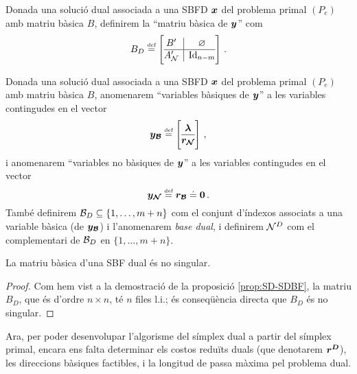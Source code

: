 \begin{defi*}\label{defi:mbd}
	Donada una solució dual associada a una SBFD $\boldsymbol{x}$ del problema primal $(P_e)$ amb matriu bàsica $B$, definirem la ``matriu bàsica de $\boldsymbol{y}$'' com
	\[
		B_D \defeq \left[
		\begin{array}{@{}c|c@{}}
			B'	  &	\varnothing	\\
			\hline
			A_\N' & \Id_{n-m}
		\end{array}
		\right]\,.
	\]
\end{defi*}

\begin{defi}\label{defi:vd}
	Donada una solució dual associada a una SBFD $\boldsymbol{x}$ del problema primal $(P_e)$ amb matriu bàsica $B$, anomenarem ``variables bàsiques de $\boldsymbol{y}$'' a les variables contingudes en el vector
	\[
		\vb{y_\B} \defeq
		\left[\begin{array}{@{}c@{}}
			\vb{\lambda}\\
			\hline
			\vb{r_\N}
		\end{array}\right]\,,
	\]
	i anomenarem ``variables no bàsiques de $\boldsymbol{y}$'' a les variables contingudes en el vector
	\[
		\boldsymbol{y_{\mathcal{N}}} \stackrel{\text{\tiny def}}{=} \boldsymbol{r_{\mathcal{B}}} \doteq \boldsymbol{0}\,.
	\]
	També definirem $\mathcal{B}_D \subseteq \{1,\ldots, m+n\}$ com el conjunt d'índexos associats a una variable bàsica (de $\boldsymbol{y_{\mathcal{B}}}$) i l'anomenarem \textit{base dual}, i definirem $\mathcal{N}^D$ com el complementari de $\mathcal{B}_D$ en $\{1,\ldots,m+n\}$.
\end{defi}

\begin{prop}
	La matriu bàsica d'una SBF dual és no singular.
	\begin{proof}
		Com hem vist a la demostració de la proposició \ref{prop:SD-SDBF}, la matriu $B_D$, que és d'ordre $n\times n$, té $n$ files l.i.; és conseqüència directa que $B_D$ és no singular.
	\end{proof}
\end{prop}

Ara, per poder desenvolupar l'algorisme del símplex dual a partir del símplex primal, encara ens falta determinar els costos reduïts duals (que denotarem $\boldsymbol{r^D}$), les direccions bàsiques factibles, i la longitud de passa màxima pel problema dual.

